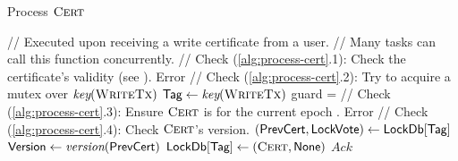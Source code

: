\begin{algorithm}[t]
    \caption{Process $\textsc{Cert}$}
    \label{alg:process-cert}
    \small
    \begin{algorithmic}[1]
        \Statex // Executed upon receiving a write certificate from a user.
        \Statex // Many tasks can call this function concurrently.
        \State // Check (\ref{alg:process-cert}.1): Check the certificate's validity (see ).
        \If{!$\valid{\cert}$} \Return Error \EndIf
        \State
        \State // Check (\ref{alg:process-cert}.2): Try to acquire a mutex over $\emph{key}(\textsc{WriteTx})$
        \State $\textsf{Tag} \gets \emph{key}(\textsc{WriteTx})$
        \State guard =   \label{alg:line:acquire_tx_guard}
        \State
        \State // Check (\ref{alg:process-cert}.3): Ensure $\textsc{Cert}$ is for the current epoch \Epoch.
        \If{$\epoch{\cert} \neq \Epoch$} \Return Error \EndIf \label{alg:line:cert-epoch-check}
        \State
        \State // Check (\ref{alg:process-cert}.4): Check $\textsc{Cert}$'s version.
        \State $(\textsf{PrevCert}, \textsf{LockVote}) \gets \textsf{LockDb}[\textsf{Tag}]$  \label{alg:line:load_cert}
        \State $\textsf{Version} \gets \emph{version}(\textsf{PrevCert})$ 
        \If{$\Version < \version{\cert}$} \label{alg:line:check-cert-version}
        \State $\textsf{LockDb}[\textsf{Tag}] \gets (\textsc{Cert}, \textsf{None})$  \label{alg:line:update-store}
        \EndIf
        \State
        \State \Return $Ack$ 
        \EndProcedure
    \end{algorithmic}
\end{algorithm}

